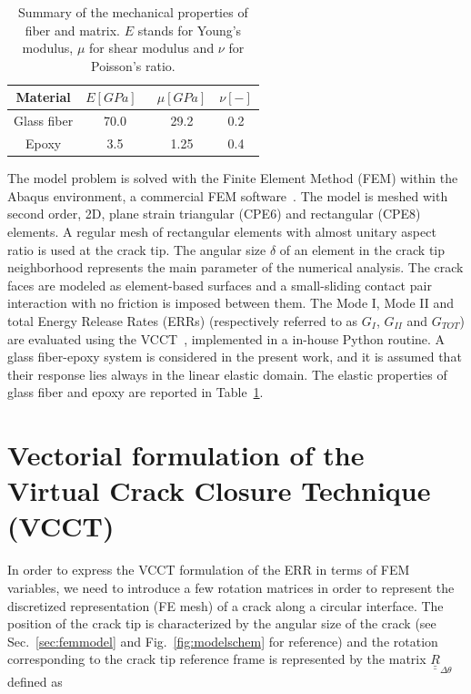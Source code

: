 \documentclass[review]{elsarticle}
\begin{document}
\begin{table}[!htbp]
 \centering
 \caption{Summary of the mechanical properties of fiber and matrix. $E$ stands for Young's modulus, $\mu$ for shear modulus and $\nu$ for Poisson's ratio.}
 \begin{tabular}{cccc}
\textbf{Material} & \textbf{$E\left[GPa\right]$}\ & \textbf{$\mu\left[GPa\right]$} & \textbf{$\nu\left[-\right]$} \\
\midrule
Glass fiber    & 70.0  & 29.2   & 0.2  \\
Epoxy    & 3.5    & 1.25   & 0.4
\end{tabular}
\label{tab:phaseprop}
\end{table}

The model problem is solved with the Finite Element Method (FEM) within the Abaqus environment, a commercial FEM software~\cite{abq12}. The model is meshed with second order, 2D, plane strain triangular (CPE6) and rectangular (CPE8) elements. A regular mesh of rectangular elements with almost unitary aspect ratio is used at the crack tip. The angular size $\delta$ of an element in the crack tip neighborhood represents the main parameter of the numerical analysis. The crack faces are modeled as element-based surfaces and a small-sliding contact pair interaction with no friction is imposed between them. The Mode I, Mode II and total Energy Release Rates (ERRs) (respectively referred to as $G_{I}$, $G_{II}$ and $G_{TOT}$) are evaluated using the VCCT~\cite{Krueger2004}, implemented in a in-house Python routine. A glass fiber-epoxy system is considered in the present work, and it is assumed that their response lies always in the linear elastic domain. The elastic properties of glass fiber and epoxy are reported in Table~\ref{tab:phaseprop}.

\section{Vectorial formulation of the Virtual Crack Closure Technique (VCCT)}
 
In order to express the VCCT formulation of the ERR in terms of FEM variables, we need to introduce a few rotation matrices in order to represent the discretized representation (FE mesh) of a crack along a circular interface. The position of the crack tip is characterized by the angular size of the crack (see Sec.~\ref{sec:femmodel} and Fig.~\ref{fig:modelschem} for reference) and the rotation corresponding to the crack tip reference frame is represented by the matrix $\underline{\underline{R}}_{\Delta\theta}$ defined as
\end{document}
